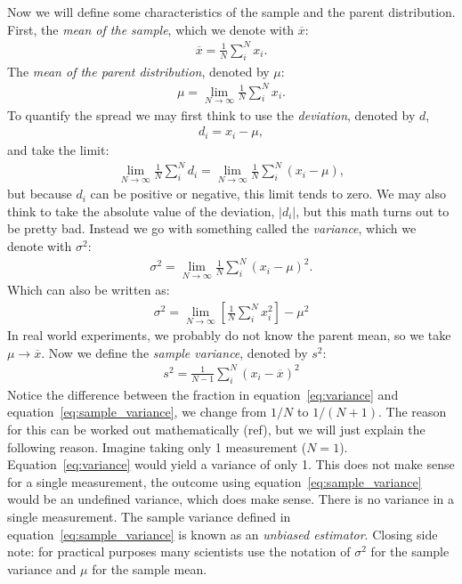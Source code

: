\documentclass{article}
\begin{document}
\noindent Now we will define some characteristics of the sample and the parent distribution. First, the \emph{mean of the sample}, which we denote with $\overline{x}$:
\begin{align}
  \overline{x} = \frac{1}{N}\sum_i^N x_i.
  \label{eq:sample_mean}
\end{align}
The \emph{mean of the parent distribution}, denoted by $\mu$:
\begin{align}
  \mu = \lim_{N\rightarrow\infty}\frac{1}{N}\sum_i^N x_i.
  \label{eq:parent_mean}
\end{align}
To quantify the spread we may first think to use the \emph{deviation}, denoted by $d$,
\begin{align}
  d_i = x_i - \mu,
  \label{eq:deviation}
\end{align}
and take the limit:
\begin{align}
  \lim_{N\rightarrow\infty} \frac{1}{N}\sum_i^N d_i = \lim_{N\rightarrow\infty} \frac{1}{N}\sum_i^N (x_i-\mu),
\end{align}
but because $d_i$ can be positive or negative, this limit tends to zero. We may also think to take the absolute value of the deviation, $|d_i|$, but this math turns out to be pretty bad. Instead we go with something called the \emph{variance}, which we denote with $\sigma^2$:
\begin{align}
  \sigma^2 = \lim_{N\rightarrow\infty}\frac{1}{N}\sum_i^N(x_i - \mu)^2.
  \label{eq:variance}
\end{align}
Which can also be written as:
\begin{align}
  \sigma^2 = \lim_{N\rightarrow\infty}\left[\frac{1}{N}\sum_i^N x_i^2\right] - \mu^2
  \label{eq:variance2}
\end{align}
In real world experiments, we probably do not know the parent mean, so we take $\mu\rightarrow \overline{x}$. Now we define the \emph{sample variance}, denoted by $s^2$:
\begin{align}
  s^2 = \frac{1}{N-1}\sum_i^N\left(x_i-\overline{x}\right)^2
  \label{eq:sample_variance}
\end{align}
Notice the difference between the fraction in equation~\ref{eq:variance} and equation~\ref{eq:sample_variance}, we change from $1/N$ to $1/(N+1)$. The reason for this can be worked out mathematically (ref), but we will just explain the following reason. Imagine taking only 1 measurement ($N=1$). Equation~\ref{eq:variance} would yield a variance of only 1. This does not make sense for a single measurement, the outcome using equation~\ref{eq:sample_variance} would be an undefined variance, which does make sense. There is no variance in a single measurement. The sample variance defined in equation~\ref{eq:sample_variance} is known as an \emph{unbiased estimator}. Closing side note: for practical purposes many scientists use the notation of $\sigma^2$ for the sample variance and $\mu$ for the sample mean.
\end{document}

